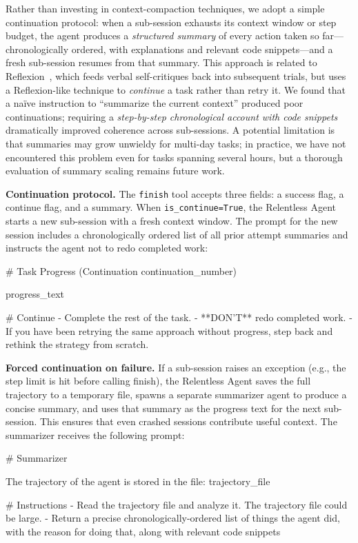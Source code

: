 \documentclass{article}
\begin{document}
Rather than investing in context-compaction techniques, we adopt a simple continuation protocol: when a sub-session exhausts its context window or step budget, the agent produces a \emph{structured summary} of every action taken so far---chronologically ordered, with explanations and relevant code snippets---and a fresh sub-session resumes from that summary.  This approach is related to Reflexion~\citep{shinn2023reflexion}, which feeds verbal self-critiques back into subsequent trials, but uses a Reflexion-like technique to \emph{continue} a task rather than retry it.  We found that a na\"ive instruction to ``summarize the current context'' produced poor continuations; requiring a \emph{step-by-step chronological account with code snippets} dramatically improved coherence across sub-sessions.  A potential limitation is that summaries may grow unwieldy for multi-day tasks; in practice, we have not encountered this problem even for tasks spanning several hours, but a thorough evaluation of summary scaling remains future work.

\textbf{Continuation protocol.}  The \texttt{finish} tool accepts three fields: a success flag, a continue flag, and a summary.  When \texttt{is\_continue=True}, the Relentless Agent starts a new sub-session with a fresh context window.  The prompt for the new session includes a chronologically ordered list of all prior attempt summaries and instructs the agent not to redo completed work:

\begin{prompt}
# Task Progress (Continuation {continuation_number})

{progress_text}

# Continue
- Complete the rest of the task.
- **DON'T** redo completed work.
- If you have been retrying the same approach without
  progress, step back and rethink the strategy from
  scratch.
\end{prompt}

\textbf{Forced continuation on failure.}  If a sub-session raises an exception (e.g., the step limit is hit before calling finish), the Relentless Agent saves the full trajectory to a temporary file, spawns a separate summarizer agent to produce a concise summary, and uses that summary as the progress text for the next sub-session.  This ensures that even crashed sessions contribute useful context.  The summarizer receives the following prompt:

\begin{prompt}
# Summarizer

The trajectory of the agent is stored in the file:
{trajectory_file}

# Instructions
- Read the trajectory file and analyze it.  The trajectory
  file could be large.
- Return a precise chronologically-ordered list of things
  the agent did, with the reason for doing that, along
  with relevant code snippets
\end{prompt}
\end{document}

